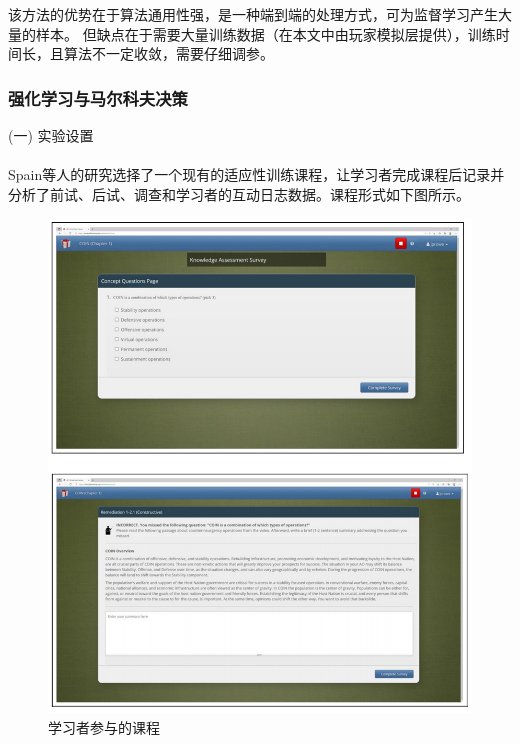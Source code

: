 \documentclass{article}
\begin{document}
            该方法的优势在于算法通用性强，是一种端到端的处理方式，可为监督学习产生大量的样本。
            但缺点在于需要大量训练数据（在本文中由玩家模拟层提供），训练时间长，且算法不一定收敛，需要仔细调参。

            \subsubsection{强化学习与马尔科夫决策}
            (一) 实验设置\paragraph{}
            Spain等人\cite{ref14}的研究选择了一个现有的适应性训练课程，让学习者完成课程后记录并分析了前试、后试、调查和学习者的互动日志数据。课程形式如下图所示。

            \begin{figure}[H]
            	
            	\centering
            	\includegraphics[scale=0.8]{images/Markov_game.png}
            	\caption{学习者参与的课程}
            	\label{fig:label}
            \end{figure}
\end{document}
